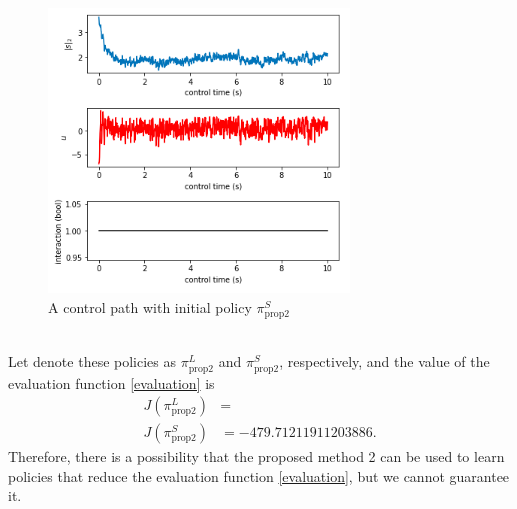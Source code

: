 \documentclass[english, dvipdfmx]{ampmt}             %
\begin{document}
\begin{figure}[h]
	\centering
 	\includegraphics[width=8cm]{proposed_2_small.png}
 	\caption{A control path with initial policy $\pi_{\textrm{prop}2}^S$} \label{proposed_2_small}
\end{figure}\\

Let denote these policies as $\pi_{\textrm{prop}2}^L$ and $\pi_{\textrm{prop}2}^S$, respectively, and the value of the evaluation function \eqref{evaluation} is 
\begin{align}
	J(\pi_{\textrm{prop}2}^L) &= \\
	J(\pi_{\textrm{prop}2}^S) &= -479.71211911203886.
\end{align}
Therefore, there is a possibility that the proposed method 2 can be used to learn policies that reduce the evaluation function \eqref{evaluation}, but we cannot guarantee it. 
\fi
\end{document}
